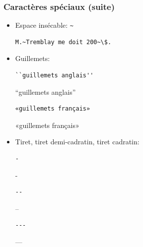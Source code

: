 \begin{frame}[fragile=singleslide]
  \frametitle{Caractères spéciaux (suite)}
  \begin{itemize}
  \item Espace insécable: \verb=~= %
\begin{lstlisting}
M.~Tremblay me doit 200~\$.
\end{lstlisting}
  \item Guillemets:
    \begin{demo}
      \begin{texample}
\begin{lstlisting}[escapeinside={}]
``guillemets anglais''
\end{lstlisting}
        \producing
        ``guillemets anglais''
      \end{texample}
      \begin{texample}
\begin{lstlisting}
«guillemets français»
\end{lstlisting}
        \producing
        «guillemets français»
      \end{texample}
   \end{demo}
  \item Tiret, tiret demi-cadratin, tiret cadratin:
    \begin{demo}
      \begin{minipage}{0.15\linewidth}
        \begin{texample}
\begin{lstlisting}
-
\end{lstlisting}
          \producing
          -
        \end{texample}
      \end{minipage}
      \hfill
      \begin{minipage}{0.15\linewidth}
        \begin{texample}
\begin{lstlisting}
--
\end{lstlisting}
          \producing
          --
        \end{texample}
      \end{minipage}
      \hfill
      \begin{minipage}{0.15\linewidth}
        \begin{texample}
\begin{lstlisting}
---
\end{lstlisting}
          \producing
          ---
        \end{texample}
      \end{minipage}
      \hfill
    \end{demo}
  \end{itemize}
\end{frame}

